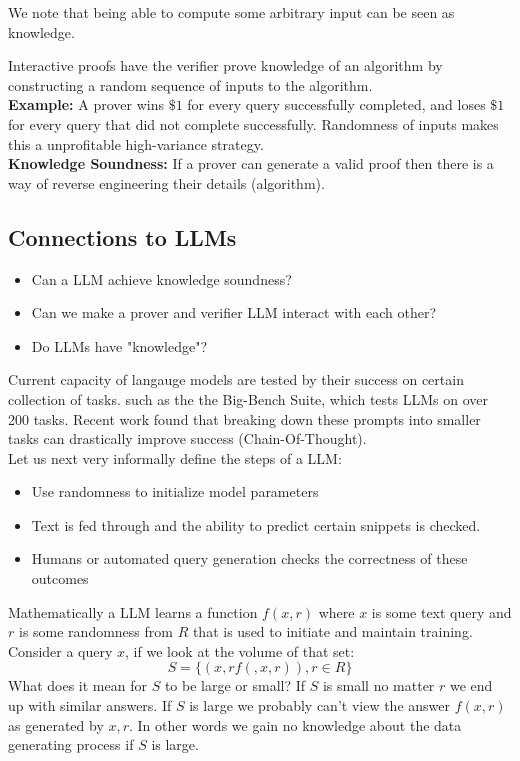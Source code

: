 \documentclass{article}
\begin{document}
We note that being able to compute some arbitrary input can be seen as knowledge. 

Interactive proofs have the verifier prove knowledge of an algorithm by constructing a random sequence of inputs to the algorithm.  \\

\textbf{Example:} A prover wins \(\$1\) for every query successfully completed, and loses \(\$1\) for every query that did not complete successfully. Randomness of inputs makes this a unprofitable high-variance strategy.  \\ 

\textbf{Knowledge Soundness:} If a prover can generate a valid proof then there is a way of reverse engineering their details (algorithm). \\ 

\subsection{Connections to LLMs}

\begin{itemize}
    \item Can a LLM achieve knowledge soundness?
    \item Can we make a prover and verifier LLM interact with each other?
    \item Do LLMs have "knowledge"?
\end{itemize}

Current capacity of langauge models are tested by their success on certain collection of tasks. such as the the Big-Bench Suite, which tests LLMs on over 200 tasks. Recent work found that breaking down these prompts into smaller tasks can drastically improve success (Chain-Of-Thought). \\ 

Let us next very informally define the steps of a LLM: 

\begin{itemize}
    \item Use randomness to initialize model parameters
    \item Text is fed through and the ability to predict certain snippets is checked. 
    \item Humans or automated query generation checks the correctness of these outcomes
\end{itemize}

Mathematically a LLM learns a function \(f(x,r)\) where \(x\) is some text query and \(r\) is some randomness from \(R\) that is used to initiate and maintain training. Consider a query \(x\), if we look at the volume of that set: 
\[
    S = \{(x,r f(,x,r)), r \in R \}
\]     
What does it mean for \(S\) to be large or small? If \(S\) is small no matter \(r\) we end up with similar answers. If \(S\) is large we probably can't  view the answer \(f(x,r)\) as generated by \(x,r\). In other words we gain no knowledge about the data generating process if \(S\) is large. 
\end{document}

